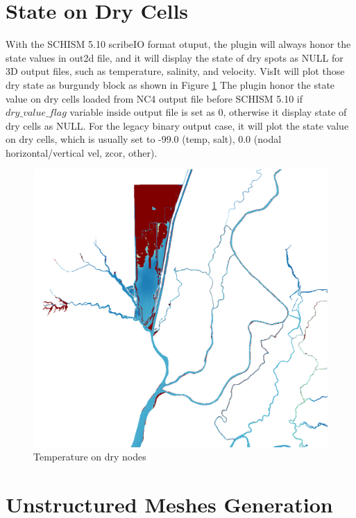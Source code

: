 \documentclass[12pt]{report}
\begin{document}
\section{State on Dry Cells}

  With the  SCHISM 5.10 scribeIO format otuput, the plugin will always honor the state values in out2d file, and it will display the state of dry spots as NULL for 3D output files, such as temperature, salinity, and velocity. VisIt will plot those dry state as burgundy block as shown in  Figure \ref{figure:dryTemperature}  The plugin  honor the state value on dry cells loaded from NC4 output file before SCHISM 5.10 if $dry\_value\_flag$ variable inside output file is set as 0, otherwise  it display state of dry cells as NULL. For the legacy binary output case, it will plot the state value on dry cells, which is usually set to -99.0 (temp, salt), 0.0 (nodal horizontal/vertical vel, zcor, other).

       \begin{figure}
        \begin{center}
        \includegraphics[scale=0.4]{dry_state_temperature}
        \caption{Temperature on dry nodes}
        \label{figure:dryTemperature}
        \end{center}
        \end{figure}
	
\section{Unstructured Meshes Generation}
	
\end{document}
